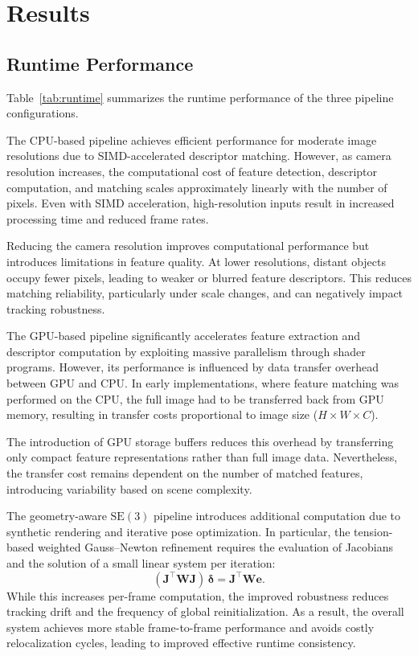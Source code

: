 \section{Results}

\subsection{Runtime Performance}

Table~\ref{tab:runtime} summarizes the runtime performance of the three pipeline configurations.

The CPU-based pipeline achieves efficient performance for moderate image resolutions due to SIMD-accelerated descriptor matching. However, as camera resolution increases, the computational cost of feature detection, descriptor computation, and matching scales approximately linearly with the number of pixels. Even with SIMD acceleration, high-resolution inputs result in increased processing time and reduced frame rates.

Reducing the camera resolution improves computational performance but introduces limitations in feature quality. At lower resolutions, distant objects occupy fewer pixels, leading to weaker or blurred feature descriptors. This reduces matching reliability, particularly under scale changes, and can negatively impact tracking robustness.

The GPU-based pipeline significantly accelerates feature extraction and descriptor computation by exploiting massive parallelism through shader programs. However, its performance is influenced by data transfer overhead between GPU and CPU. In early implementations, where feature matching was performed on the CPU, the full image had to be transferred back from GPU memory, resulting in transfer costs proportional to image size ($H \times W \times C$).

The introduction of GPU storage buffers reduces this overhead by transferring only compact feature representations rather than full image data. Nevertheless, the transfer cost remains dependent on the number of matched features, introducing variability based on scene complexity.

The geometry-aware $\mathrm{SE}(3)$ pipeline introduces additional computation due to synthetic rendering and iterative pose optimization. In particular, the tension-based weighted Gauss--Newton refinement requires the evaluation of Jacobians and the solution of a small linear system per iteration:
\[
(\mathbf{J}^\top \mathbf{W} \mathbf{J})\,\boldsymbol{\delta}
=
\mathbf{J}^\top \mathbf{W} \mathbf{e}.
\]
While this increases per-frame computation, the improved robustness reduces tracking drift and the frequency of global reinitialization. As a result, the overall system achieves more stable frame-to-frame performance and avoids costly relocalization cycles, leading to improved effective runtime consistency.